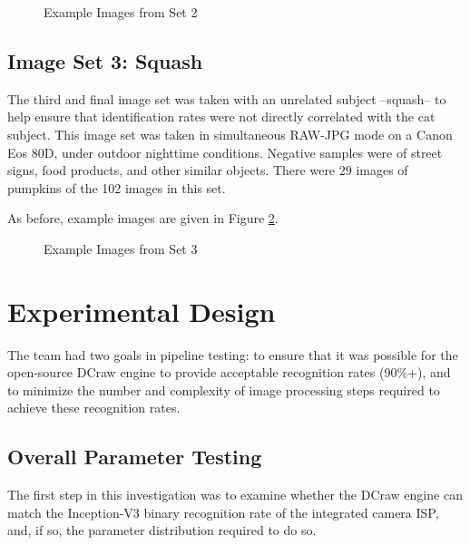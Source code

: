 \documentclass{report}
\begin{document}
		\begin{figure}[h]
			\begin{center}
				\caption{Example Images from Set 2}
				\label{set2}
			\end{center}
		\end{figure}		
		
		\subsection{Image Set 3: Squash}
		The third and final image set was taken with an unrelated subject --squash-- to help ensure that identification rates were not directly correlated with the cat subject. This image set was taken in simultaneous RAW-JPG mode on a Canon Eos 80D, under outdoor nighttime conditions. Negative samples were of street signs, food products, and other similar objects. There were 29 images of pumpkins of the 102 images in this set.
		
		As before, example images are given in Figure \ref{set3}.
		
	\begin{figure}[h]
		\begin{center}
			\caption{Example Images from Set 3}
			\label{set3}
		\end{center}
	\end{figure}	
		
	\section{Experimental Design}
		The team had two goals in pipeline testing: to ensure that it was possible for the open-source DCraw engine to provide acceptable recognition rates (90\%+), and to minimize the number and complexity of image processing steps required to achieve these recognition rates.
		\subsection{Overall Parameter Testing}
		The first step in this investigation was to examine whether the DCraw engine can match the Inception-V3 binary recognition rate of the integrated camera ISP, and, if so, the parameter distribution required to do so.
		
\end{document}
